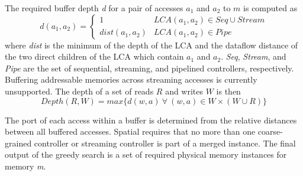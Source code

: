 The required buffer depth \emph{d} for a pair of accesses $a_1$ and $a_2$ to $m$ is computed as
\[
d(a_1, a_2) = \left\{\begin{matrix} 1 & LCA(a_1, a_2) \in Seq \cup Stream \\ dist(a_1,a_2) & LCA(a_1,a_2) \in Pipe\end{matrix}\right.
\]
where \emph{dist} is the minimum of the depth of the LCA and the dataflow distance of the two direct children of the LCA which contain $a_1$ and $a_2$. \emph{Seq}, \emph{Stream}, and \emph{Pipe} are the set of sequential, streaming, and pipelined controllers, respectively. Buffering addressable memories across streaming accesses is currently unsupported.
The depth of a set of reads $R$ and writes $W$ is then
\[ Depth(R,W) = max\{ d(w,a)~\forall ~(w,a) \in W \times (W\cup R) \} \]

The port of each access within a buffer is determined from the relative distances between all buffered accesses.
Spatial requires that no more than one coarse-grained controller or streaming controller is part of a merged instance.
The final output of the greedy search is a set of required physical memory instances for memory \emph{m}.

